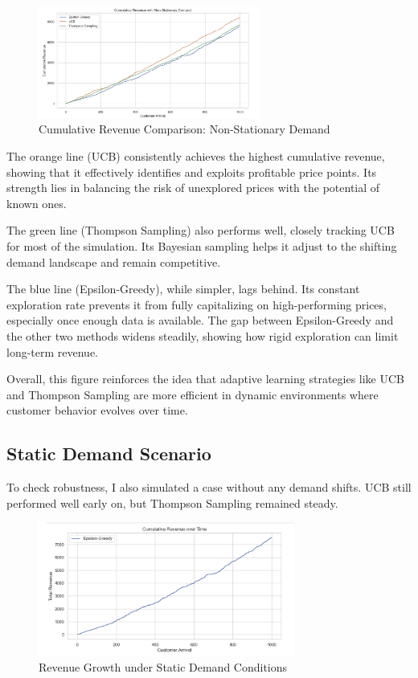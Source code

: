 \documentclass[12pt]{article}
\begin{document}
\begin{figure}[h!]
  \centering
  \includegraphics[width=0.65\textwidth]{cumulative revenue with non stationary demand.png}
  \caption{Cumulative Revenue Comparison: Non-Stationary Demand}
  \label{fig:nonstationary-revenue}
\end{figure}

The orange line (UCB) consistently achieves the highest cumulative revenue, showing that it effectively identifies and exploits profitable price points. Its strength lies in balancing the risk of unexplored prices with the potential of known ones. 

The green line (Thompson Sampling) also performs well, closely tracking UCB for most of the simulation. Its Bayesian sampling helps it adjust to the shifting demand landscape and remain competitive.

The blue line (Epsilon-Greedy), while simpler, lags behind. Its constant exploration rate prevents it from fully capitalizing on high-performing prices, especially once enough data is available. The gap between Epsilon-Greedy and the other two methods widens steadily, showing how rigid exploration can limit long-term revenue.

Overall, this figure reinforces the idea that adaptive learning strategies like UCB and Thompson Sampling are more efficient in dynamic environments where customer behavior evolves over time.
\newpage
\subsection*{Static Demand Scenario}
To check robustness, I also simulated a case without any demand shifts. UCB still performed well early on, but Thompson Sampling remained steady.

\begin{figure}[h!]
  \centering
  \includegraphics[width=0.75\textwidth]{cumulative revenue over time.png}
  \caption{Revenue Growth under Static Demand Conditions}
  \label{fig:static-revenue}
\end{figure}
\end{document}
